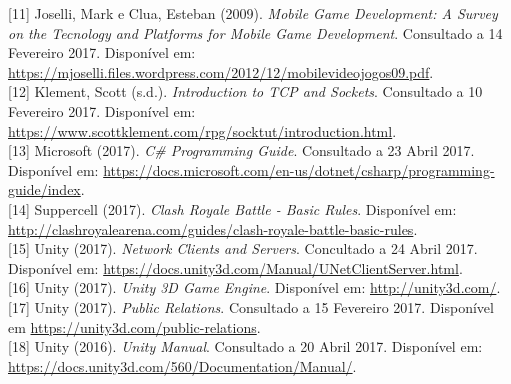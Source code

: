 [11] Joselli, Mark e Clua, Esteban (2009). \textit{Mobile Game Development: A Survey on the Tecnology and Platforms for Mobile Game Development}. Consultado a 14 Fevereiro 2017. Disponível em: \url{https://mjoselli.files.wordpress.com/2012/12/mobilevideojogos09.pdf}. \\

[12] Klement, Scott (s.d.). \textit{Introduction to TCP and Sockets}.  Consultado a 10 Fevereiro 2017. Disponível em: \url{https://www.scottklement.com/rpg/socktut/introduction.html}. \\

[13] Microsoft (2017). \textit{C\# Programming Guide}. Consultado a 23 Abril 2017. Disponível em: \url{https://docs.microsoft.com/en-us/dotnet/csharp/programming-guide/index}. \\

[14] Suppercell (2017). \textit{Clash Royale Battle - Basic Rules}.  Disponível em: \url{http://clashroyalearena.com/guides/clash-royale-battle-basic-rules}. \\

[15] Unity (2017). \textit{Network Clients and Servers}. Concultado a 24 Abril 2017. Disponível em: \url{https://docs.unity3d.com/Manual/UNetClientServer.html}. \\

[16] Unity (2017). \textit{Unity 3D Game Engine}. Disponível em: \url{http://unity3d.com/}. \\

[17] Unity (2017). \textit{Public Relations}. Consultado a 15 Fevereiro 2017. Disponível em \url{https://unity3d.com/public-relations}. \\

[18] Unity (2016). \textit{Unity Manual}. Consultado a 20 Abril 2017. Disponível em: \url{https://docs.unity3d.com/560/Documentation/Manual/}. \\














